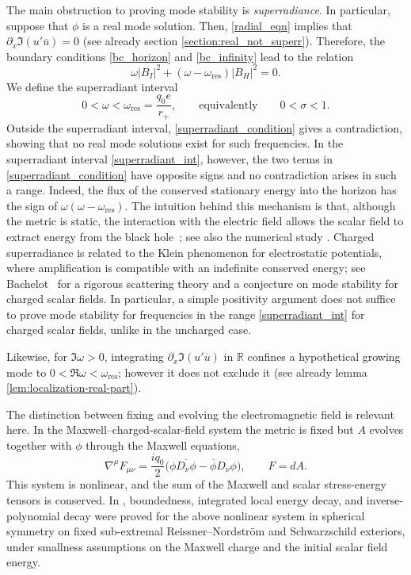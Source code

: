 \documentclass[11pt]{article}
\numberwithin{equation}{section}
\newcommand{\br}[1]{\left( #1 \right)}
\begin{document}
	
	
	The main obstruction to proving mode stability is \emph{superradiance}. In particular, suppose that $\phi$ is a real mode solution. Then, \eqref{radial_eqn} implies that  $\partial_x \Im \br{u' \overline{u}}=0$ (see already section \ref{section:real_not_superr}). Therefore, the boundary conditions \eqref{bc_horizon} and \eqref{bc_infinity} lead to the relation
	\begin{equation} \label{superradiant_condition}
		\omega |B_I|^2+
		(\omega-\omega_{\mathrm{res}})|B_H|^2=0.
	\end{equation}
	We define the superradiant interval
	\begin{equation} \label{superradiant_int}
		0<\omega<\omega_{\mathrm{res}}=\frac{q_0e}{r_+},
		\qquad\text{equivalently}\qquad 0<\sigma<1.
	\end{equation}
	Outside the superradiant interval, 
	\eqref{superradiant_condition} gives a contradiction, showing that no real mode solutions exist for such frequencies.
	In the superradiant interval \eqref{superradiant_int}, however, the two terms in \eqref{superradiant_condition}
	have opposite signs and no contradiction arises in such a range.
	Indeed, the flux of the conserved stationary energy into the horizon
	has the sign of $\omega(\omega-\omega_{\mathrm{res}})$. 
	The intuition behind this mechanism is that, although the metric is static,
	the interaction with the electric field allows the scalar field to
	extract energy from the black hole~\cite{Bekenstein1973}; see also
	the numerical study \cite{DiMenzaNicolas2015}. {Charged superradiance is related to the Klein phenomenon for electrostatic potentials, where amplification is compatible with an indefinite conserved energy; see Bachelot~\cite{Bachelot2004} for a rigorous scattering theory and a conjecture on mode stability for charged scalar fields.} In particular, a simple positivity argument does not suffice to prove mode stability for frequencies in the range \eqref{superradiant_int} for charged scalar fields, {unlike in the uncharged case}.
	
	Likewise, for
	$\Im\omega>0$, integrating $\partial_x \Im \br{u' \overline{u}}$ in $\mathbb{R}$ 
	confines a hypothetical growing mode to
	$0<\Re\omega<\omega_{\mathrm{res}}$; however it does not exclude it (see already lemma \ref{lem:localization-real-part}).
	
	
	The distinction between fixing and evolving the electromagnetic field
	is relevant here. In the Maxwell--charged-scalar-field system  the metric is fixed
	but $A$ evolves together with $\phi$ through the Maxwell equations,
	\[
	\nabla^\mu F_{\mu\nu}
	=\frac{iq_0}{2}
	\bigl(\phi\overline{D_\nu\phi}-\overline\phi D_\nu\phi\bigr),
	\qquad F=dA.
	\]
	This system is nonlinear, and the sum of the Maxwell and scalar
	stress-energy tensors is conserved. 
	In \cite{VdM2022}, boundedness, integrated local
	energy decay, and inverse-polynomial decay {were} proved for the above nonlinear system
	in spherical symmetry on fixed sub-extremal Reissner--Nordstr\"om
	and Schwarzschild exteriors, under smallness assumptions on the
	Maxwell charge and the initial scalar field energy.
	
\end{document}
